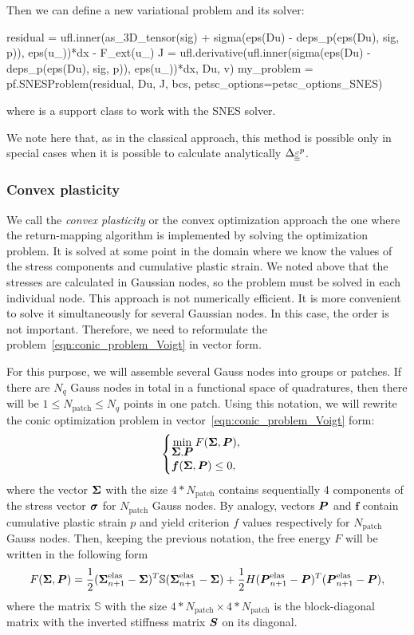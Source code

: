 \documentclass[12pt]{article}
\begin{document}
Then we can define a new variational problem and its solver:
\begin{pythoncode}
    residual = ufl.inner(as_3D_tensor(sig) + sigma(eps(Du) - deps_p(eps(Du), sig, p)), eps(u_))*dx - F_ext(u_)
    J = ufl.derivative(ufl.inner(sigma(eps(Du) - deps_p(eps(Du), sig, p)), eps(u_))*dx, Du, v)
    my_problem = pf.SNESProblem(residual, Du, J, bcs, petsc_options=petsc_options_SNES)
\end{pythoncode}
where  is a support class to work with the SNES solver.

We note here that, as in the classical approach, this method is possible only in special cases when it is possible to calculate analytically $\Delta\underline{\underline{\varepsilon}}^p$.

\subsubsection{Convex plasticity}
We call the \textit{convex plasticity} or the convex optimization approach the one where the return-mapping algorithm is implemented by solving the optimization problem. It is solved at some point in the domain where we know the values of the stress components and cumulative plastic strain. We noted above that the stresses are calculated in Gaussian nodes, so the problem must be solved in each individual node. This approach is not numerically efficient. It is more convenient to solve it simultaneously for several Gaussian nodes. In this case, the order is not important. Therefore, we need to reformulate the problem~\eqref{eqn:conic_problem_Voigt} in vector form. 

For this purpose, we will assemble several Gauss nodes into groups or patches. If there are $N_q$ Gauss nodes in total in a functional space of quadratures, then there will be $1 \leq N_\text{patch} \leq N_q$ points in one patch. Using this notation, we will rewrite the conic optimization problem in vector~\eqref{eqn:conic_problem_Voigt} form:
\begin{equation}
    \label{eqn:conic_problem_vectorized}
    \begin{cases}
        \min\limits_{\mbox{\boldmath $\Sigma$}, \mbox{\boldmath $P$}} F(\mbox{\boldmath $\Sigma$}, \mbox{\boldmath $P$}), \\
        \mbox{\boldmath $f$}(\mbox{\boldmath $\Sigma$}, \mbox{\boldmath $P$}) \leq 0,
    \end{cases}
\end{equation}
where the vector $\mbox{\boldmath $\Sigma$}$ with the size $4*N_\text{patch}$ contains sequentially 4 components of the stress vector $\mbox{\boldmath$\sigma$}$ for $N_\text{patch}$ Gauss nodes. By analogy, vectors $\mbox{\boldmath $P$}$ and $\mathbold{f}$ contain cumulative plastic strain $p$ and yield criterion $f$ values respectively for $N_\text{patch}$ Gauss nodes. Then, keeping the previous notation, the free energy $F$ will be written in the following form 
\begin{equation}
    F(\mbox{\boldmath $\Sigma$}, \mbox{\boldmath $P$}) = \frac{1}{2}(\mbox{\boldmath $\Sigma$}_{n+1}^\text{elas} - \mbox{\boldmath $\Sigma$})^T \mathbb{S} (\mbox{\boldmath $\Sigma$}_{n+1}^\text{elas} - \mbox{\boldmath $\Sigma$}) + \frac{1}{2}H(\mbox{\boldmath $P$}_{n+1}^\text{elas} - \mbox{\boldmath $P$})^T(\mbox{\boldmath $P$}_{n+1}^\text{elas} - \mbox{\boldmath $P$}),
\end{equation}
where the matrix $\mathbb{S}$ with the size $4*N_\text{patch}\times4*N_\text{patch}$ is the block-diagonal matrix with the inverted stiffness matrix $\mbox{\boldmath $S$}$ on its diagonal.
\end{document}
